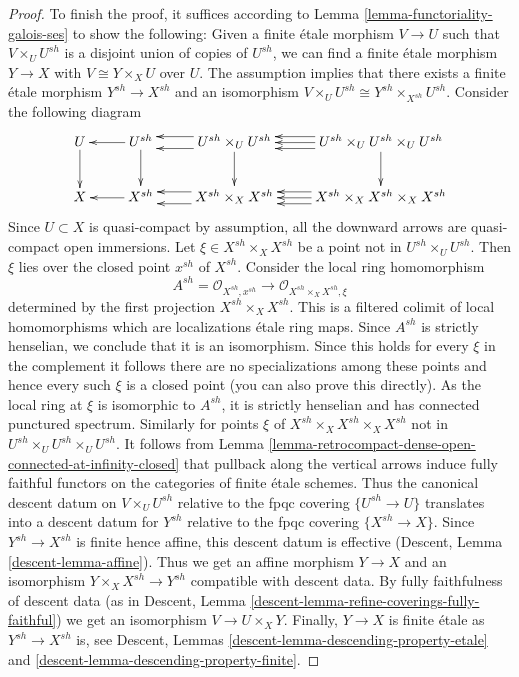 \documentclass{stacks-project}
\theoremstyle{plain}
\theoremstyle{definition}
\theoremstyle{remark}
\numberwithin{equation}{subsection}
\begin{document}
\begin{proof}
\medskip\noindent
To finish the proof, it suffices according to
Lemma \ref{lemma-functoriality-galois-ses}
to show the following: Given a finite \'etale morphism
$V \to U$ such that $V \times_U U^{sh}$ is a disjoint
union of copies of $U^{sh}$, we can find a finite \'etale
morphism $Y \to X$ with $V \cong Y \times_X U$ over $U$.
The assumption implies that there exists a finite \'etale
morphism $Y^{sh} \to X^{sh}$ and an isomorphism
$V \times_U U^{sh} \cong Y^{sh} \times_{X^{sh}} U^{sh}$.
Consider the following diagram
$$
\xymatrix{
U \ar[d] & U^{sh} \ar[d] \ar[l] &
U^{sh} \times_U U^{sh} \ar[d] \ar@<1ex>[l] \ar@<-1ex>[l] &
U^{sh} \times_U U^{sh} \times_U U^{sh}
\ar[d] \ar@<1ex>[l] \ar[l] \ar@<-1ex>[l] \\
X & X^{sh} \ar[l] &
X^{sh} \times_X X^{sh} \ar@<1ex>[l] \ar@<-1ex>[l] &
X^{sh} \times_X X^{sh} \times_X X^{sh} \ar@<1ex>[l] \ar[l] \ar@<-1ex>[l]
}
$$
Since $U \subset X$ is quasi-compact by assumption, all the
downward arrows are quasi-compact open immersions.
Let $\xi \in X^{sh} \times_X X^{sh}$ be a point not
in $U^{sh} \times_U U^{sh}$. Then $\xi$ lies over the closed
point $x^{sh}$ of $X^{sh}$.
Consider the local ring homomorphism
$$
A^{sh} = \mathcal{O}_{X^{sh}, x^{sh}} \to
\mathcal{O}_{X^{sh} \times_X X^{sh}, \xi}
$$
determined by the first projection $X^{sh} \times_X X^{sh}$.
This is a filtered colimit of local homomorphisms which are
localizations \'etale ring maps.
Since $A^{sh}$ is strictly henselian, we conclude that it is an
isomorphism. Since this holds for every $\xi$ in the complement
it follows there are no specializations among these points and
hence every such $\xi$ is a closed point (you can also prove
this directly). As the local ring at $\xi$ is isomorphic
to $A^{sh}$, it is strictly henselian and has connected punctured spectrum.
Similarly for points $\xi$ of $X^{sh} \times_X X^{sh} \times_X X^{sh}$ not
in $U^{sh} \times_U U^{sh} \times_U U^{sh}$. It follows from
Lemma \ref{lemma-retrocompact-dense-open-connected-at-infinity-closed}
that pullback along the vertical arrows induce fully faithful functors on
the categories of finite \'etale schemes. Thus the
canonical descent datum on $V \times_U U^{sh}$ relative to
the fpqc covering $\{U^{sh} \to U\}$ translates into a
descent datum for $Y^{sh}$ relative to the fpqc covering $\{X^{sh} \to X\}$.
Since $Y^{sh} \to X^{sh}$ is finite hence affine, this descent datum is
effective (Descent, Lemma \ref{descent-lemma-affine}).
Thus we get an affine morphism $Y \to X$ and an isomorphism
$Y \times_X X^{sh} \to Y^{sh}$ compatible with descent data.
By fully faithfulness of descent data
(as in Descent, Lemma \ref{descent-lemma-refine-coverings-fully-faithful})
we get an isomorphism $V \to U \times_X Y$.
Finally, $Y \to X$ is finite \'etale as $Y^{sh} \to X^{sh}$ is, see
Descent, Lemmas \ref{descent-lemma-descending-property-etale} and
\ref{descent-lemma-descending-property-finite}.
\end{proof}
\end{document}
